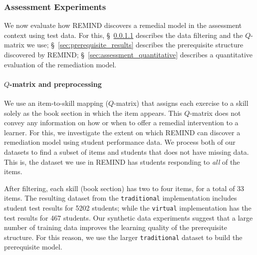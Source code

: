 \documentclass{edm_template}
\newcommand{\hl}[1]{\colorbox{yellow}{#1}}
\begin{document}
{	%
	
	
	\subsubsection{Assessment Experiments}
	\label{sec:assessment_results}
	We now evaluate how REMIND  discovers a remedial model in the assessment context using test data.
	For this, \S~\ref{sec:preprocessing} describes  the data filtering  and the $Q$-matrix we use;
	\S~\ref{sec:prerequisite_results} describes the prerequisite structure discovered by REMIND;
	\S~\ref{sec:assessment_quantitative} describes a quantitative evaluation of the remediation model.
	
	\paragraph{$Q$-matrix and preprocessing}
	\label{sec:preprocessing}
	We use an item-to-skill mapping ($Q$-matrix) that assigns each exercise to a skill  solely as the book section in which the item appears.
	This $Q$-matrix does not convey any information on how or when to offer a remedial intervention to a learner.
	For this, we investigate the extent on which REMIND can discover a remediation model using student performance data.
	We process both of our datasets to  find a subset of  items and students that does not have missing data.
	This is,  the dataset we use in REMIND has  students  responding to \textit{all} of the  items.
	
	After filtering, each skill (book section) has two to four items, for a total of  33  items.
	The resulting dataset from the \texttt{traditional} implementation includes student test results for 5202 students; 
	while the \texttt{virtual} implementation has the test results for 467 students.
	Our synthetic data experiments suggest that a large number of training data improves the learning quality of the prerequisite structure.
	For this reason, we use the larger \texttt{traditional} dataset to build the prerequisite model.
	
}
\end{document}
